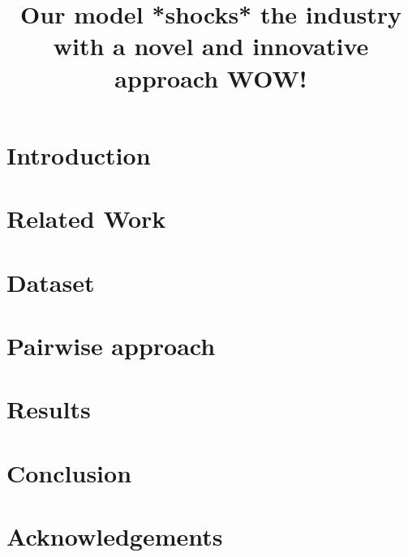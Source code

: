 \documentclass[10pt, a4paper]{article}
\title{{\color{red} Our model *shocks* the industry with a novel and innovative approach WOW!}}
\begin{document}
\maketitleabstract

\section{Introduction} \label{intro}


\section{Related Work}
 \label{related-work}

\section{Dataset} \label{dataset}


\section{Pairwise approach} \label{approach}


\section{Results} \label{results}


\section{Conclusion}
 \label{conclusion}

\section{Acknowledgements}




 
\end{document}
